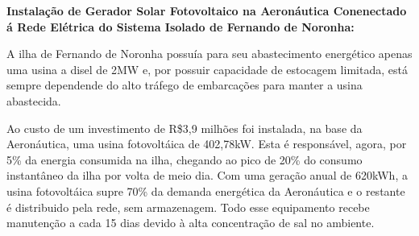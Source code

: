 
\textbf{Instalação de Gerador Solar Fotovoltaico na Aeronáutica Conenectado á
Rede Elétrica do Sistema Isolado de Fernando de Noronha:}

A ilha de Fernando de Noronha possuía para seu abastecimento energético apenas
uma usina a disel de 2MW e, por possuir capacidade de estocagem limitada, está
sempre dependende do alto tráfego de embarcações para manter a usina abastecida.

Ao custo de um investimento de R\$3,9 milhões foi instalada, na base da
Aeronáutica, uma usina fotovoltáica de 402,78kW. Esta é responsável, agora, por
5\% da energia consumida na ilha, chegando ao pico de 20\% do consumo
instantâneo da ilha por volta de meio dia.
Com uma geração anual de 620kWh, a usina fotovoltáica supre 70\% da demanda
energética da Aeronáutica e o restante é distribuido pela rede, sem armazenagem.
Todo esse equipamento recebe manutenção a cada 15 dias devido à alta
concentração de sal no ambiente.
